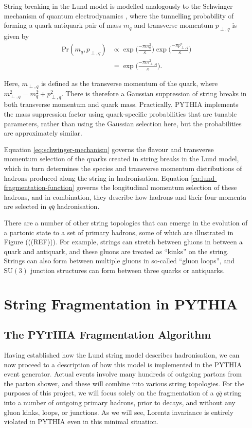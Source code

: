 \documentclass[12pt,a4paper]{report}
\begin{document}
String breaking in the Lund model is modelled analogously to the Schwinger mechanism of quantum electrodynamics \cite{Schwinger:1962tp}, where the tunnelling probability of forming a quark-antiquark pair of mass $m_q$ and transverse momentum $p_{\perp,q}$ is given by
\begin{align}\label{eq:schwinger-mechanism}
  \text{Pr}(m_q, p_{\perp,q}) &\propto \exp\Bigr(\frac{-\pi m_q^2}{\kappa}\Bigr) \exp\Bigr(\frac{-\pi p_{\perp,q}^2}{\kappa}\Bigr) \nonumber \\
  &= \exp \Bigr(\frac{-\pi m_{\perp,q}^2}{\kappa}\Bigr).
\end{align}

Here, $m_{\perp,q}$ is defined as the transverse momentum of the quark, where $m_{\perp,q}^2 = m_q^2 + p_{\perp,q}^2$. There is therefore a Gaussian suppression of string breaks in both transverse momentum and quark mass. Practically, PYTHIA implements the mass suppression factor using quark-specific probabilities that are tunable parameters, rather than using the Gaussian selection here, but the probabilities are approximately similar.

Equation \eqref{eq:schwinger-mechanism} governs the flavour and transverse momentum selection of the quarks created in string breaks in the Lund model, which in turn determines the species and transverse momentum distributions of hadrons produced along the string in hadronisation. Equation \eqref{eq:lund-fragmentation-function} governs the longitudinal momentum selection of these hadrons, and in combination, they describe how hadrons and their four-momenta are selected in $q\bar{q}$ hadronisation.

There are a number of other string topologies that can emerge in the evolution of a partonic state to a set of primary hadrons, some of which are illustrated in Figure (((REF))). For example, strings can stretch between gluons in between a quark and antiquark, and these gluons are treated as ``kinks'' on the string. Strings can also form between multiple gluons in so-called ``gluon loops'', and $\text{SU}(3)$ junction structures can form between three quarks or antiquarks.

\chapter{String Fragmentation in PYTHIA}
\label{chap:fragmentation}
\section{The PYTHIA Fragmentation Algorithm}
Having established how the Lund string model describes hadronisation, we can now proceed to a description of how this model is implemented in the PYTHIA event generator. Actual events involve many hundreds of outgoing partons from the parton shower, and these will combine into various string topologies. For the purposes of this project, we will focus solely on the fragmentation of a $q\bar{q}$ string into a number of outgoing primary hadrons, prior to decays, and without any gluon kinks, loops, or junctions. As we will see, Lorentz invariance is entirely violated in PYTHIA even in this minimal situation.
\end{document}
